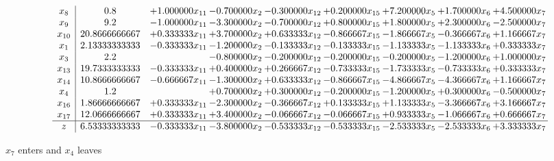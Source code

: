 \documentclass[10pt]{article}
\begin{document}
 \[\begin{array}{c| c c@{\hskip 2pt} c@{\hskip 2pt} c@{\hskip 2pt} c@{\hskip 2pt} c@{\hskip 2pt} c@{\hskip 2pt} c@{\hskip 2pt} }
 x_{8}   &  0.8 & + 1.000000 x_{11} & -0.700000 x_{2} & -0.300000 x_{12} & + 0.200000 x_{15} & + 7.200000 x_{5} & + 1.700000 x_{6} & + 4.500000 x_{7}\\
 x_{9}   &  9.2 & -1.000000 x_{11} & -3.300000 x_{2} & -0.700000 x_{12} & + 0.800000 x_{15} & + 1.800000 x_{5} & + 2.300000 x_{6} & -2.500000 x_{7}\\
 x_{10}   &  20.8666666667 & + 0.333333 x_{11} & + 3.700000 x_{2} & + 0.633333 x_{12} & -0.866667 x_{15} & -1.866667 x_{5} & -0.366667 x_{6} & + 1.166667 x_{7}\\
 x_{1}   &  2.13333333333 & -0.333333 x_{11} & -1.200000 x_{2} & -0.133333 x_{12} & -0.133333 x_{15} & -1.133333 x_{5} & -1.133333 x_{6} & + 0.333333 x_{7}\\
 x_{3}   &  2.2  &   & -0.800000 x_{2} & -0.200000 x_{12} & -0.200000 x_{15} & -0.200000 x_{5} & -1.200000 x_{6} & + 1.000000 x_{7}\\
 x_{13}   &  19.7333333333 & -0.333333 x_{11} & + 0.400000 x_{2} & + 0.266667 x_{12} & -0.733333 x_{15} & -1.733333 x_{5} & -0.733333 x_{6} & + 0.333333 x_{7}\\
 x_{14}   &  10.8666666667 & -0.666667 x_{11} & -1.300000 x_{2} & + 0.633333 x_{12} & -0.866667 x_{15} & -4.866667 x_{5} & -4.366667 x_{6} & + 1.166667 x_{7}\\
 x_{4}   &  1.2  &   & + 0.700000 x_{2} & + 0.300000 x_{12} & -0.200000 x_{15} & -1.200000 x_{5} & + 0.300000 x_{6} & -0.500000 x_{7}\\
 x_{16}   &  1.86666666667 & + 0.333333 x_{11} & -2.300000 x_{2} & -0.366667 x_{12} & + 0.133333 x_{15} & + 1.133333 x_{5} & -3.366667 x_{6} & + 3.166667 x_{7}\\
 x_{17}   &  12.0666666667 & + 0.333333 x_{11} & + 3.400000 x_{2} & -0.066667 x_{12} & -0.066667 x_{15} & + 0.933333 x_{5} & -1.066667 x_{6} & + 0.666667 x_{7}\\
\hline
z    &  6.53333333333 & -0.333333 x_{11} & -3.800000 x_{2} & -0.533333 x_{12} & -0.533333 x_{15} & -2.533333 x_{5} & -2.533333 x_{6} & + 3.333333 x_{7}\\
\end{array}\]


 $ x_{7} $ enters and $ x_{4} $ leaves 
\end{document}
